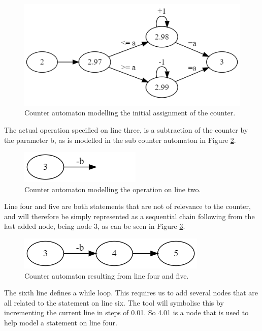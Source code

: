 \documentclass[12pt]{article}
\begin{document}
\begin{figure}[h]
	\centering
	\includegraphics[width=0.7\linewidth]{final_overview_3}
	\caption{Counter automaton modelling the initial assignment of the counter.}
	\label{fig:final_overview_3}
\end{figure}

The actual operation specified on line three, is a subtraction of the counter by the parameter b, as is modelled in the sub counter automaton in Figure \ref{fig:final_overview_4}.

\begin{figure}[h]
	\centering
	\includegraphics[width=0.35\linewidth]{final_overview_4}
	\caption{Counter automaton modelling the operation on line two.}
	\label{fig:final_overview_4}
\end{figure}

Line four and five are both statements that are not of relevance to the counter, and will therefore be simply represented as a sequential chain following from the last added node, being node 3, as can be seen in Figure \ref{fig:final_overview_5}.

\begin{figure}[h]
	\centering
	\includegraphics[width=0.5\linewidth]{final_overview_5}
	\caption{Counter automaton resulting from line four and five.}
	\label{fig:final_overview_5}
\end{figure}

The sixth line defines a while loop. This requires us to add several nodes that are all related to the statement on line six. The tool will symbolise this by incrementing the current line in steps of 0.01. So 4.01 is a node that is used to help model a statement on line four.
\end{document}
